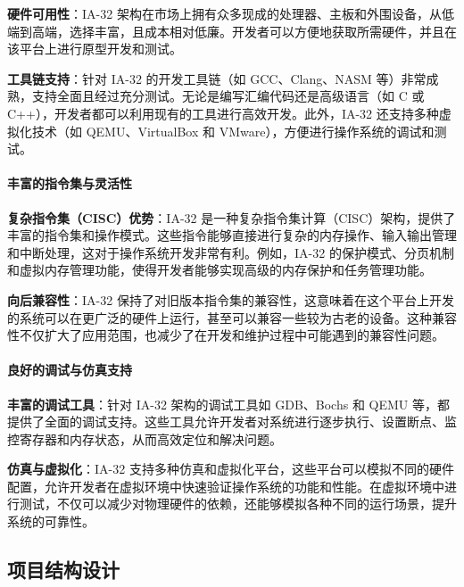 \textbf{硬件可用性}：IA-32 架构在市场上拥有众多现成的处理器、主板和外围设备，从低端到高端，选择丰富，且成本相对低廉。开发者可以方便地获取所需硬件，并且在该平台上进行原型开发和测试。

\textbf{工具链支持}：针对 IA-32 的开发工具链（如 GCC、Clang、NASM 等）非常成熟，支持全面且经过充分测试。无论是编写汇编代码还是高级语言（如 C 或 C++），开发者都可以利用现有的工具进行高效开发。此外，IA-32 还支持多种虚拟化技术（如 QEMU、VirtualBox 和 VMware），方便进行操作系统的调试和测试。

\paragraph{丰富的指令集与灵活性}

\textbf{复杂指令集（CISC）优势}：IA-32 是一种复杂指令集计算（CISC）架构，提供了丰富的指令集和操作模式。这些指令能够直接进行复杂的内存操作、输入输出管理和中断处理，这对于操作系统开发非常有利。例如，IA-32 的保护模式、分页机制和虚拟内存管理功能，使得开发者能够实现高级的内存保护和任务管理功能。

\textbf{向后兼容性}：IA-32 保持了对旧版本指令集的兼容性，这意味着在这个平台上开发的系统可以在更广泛的硬件上运行，甚至可以兼容一些较为古老的设备。这种兼容性不仅扩大了应用范围，也减少了在开发和维护过程中可能遇到的兼容性问题。

\paragraph{良好的调试与仿真支持}

\textbf{丰富的调试工具}：针对 IA-32 架构的调试工具如 GDB、Bochs 和 QEMU 等，都提供了全面的调试支持。这些工具允许开发者对系统进行逐步执行、设置断点、监控寄存器和内存状态，从而高效定位和解决问题。

\textbf{仿真与虚拟化}：IA-32 支持多种仿真和虚拟化平台，这些平台可以模拟不同的硬件配置，允许开发者在虚拟环境中快速验证操作系统的功能和性能。在虚拟环境中进行测试，不仅可以减少对物理硬件的依赖，还能够模拟各种不同的运行场景，提升系统的可靠性。

\subsection{项目结构设计}

